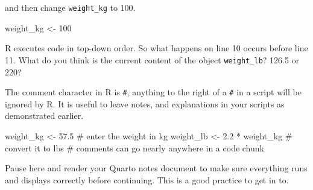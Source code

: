 \documentclass[
  letterpaper,
  DIV=11,
  numbers=noendperiod,
  oneside]{scrreprt}
\newenvironment{Shaded}{\begin{snugshade}}{\end{snugshade}}
\newcommand{\CommentTok}[1]{\textcolor[rgb]{0.37,0.37,0.37}{#1}}
\newcommand{\DecValTok}[1]{\textcolor[rgb]{0.68,0.00,0.00}{#1}}
\newcommand{\FloatTok}[1]{\textcolor[rgb]{0.68,0.00,0.00}{#1}}
\newcommand{\NormalTok}[1]{\textcolor[rgb]{0.00,0.23,0.31}{#1}}
\newcommand{\OtherTok}[1]{\textcolor[rgb]{0.00,0.23,0.31}{#1}}
\newcommand{\SpecialCharTok}[1]{\textcolor[rgb]{0.37,0.37,0.37}{#1}}
\begin{document}
and then change \texttt{weight\_kg} to 100.

\begin{Shaded}
\begin{Highlighting}[]
\NormalTok{weight\_kg }\OtherTok{\textless{}{-}} \DecValTok{100}
\end{Highlighting}
\end{Shaded}

R executes code in top-down order. So what happens on line 10 occurs
before line 11. What do you think is the current content of the object
\texttt{weight\_lb}? 126.5 or 220?

\begin{tcolorbox}[enhanced jigsaw, bottomrule=.15mm, colback=white, colframe=quarto-callout-note-color-frame, toprule=.15mm, coltitle=black, rightrule=.15mm, opacitybacktitle=0.6, colbacktitle=quarto-callout-note-color!10!white, toptitle=1mm, leftrule=.75mm, breakable, bottomtitle=1mm, titlerule=0mm, title=\textcolor{quarto-callout-note-color}{\faInfo}\hspace{0.5em}{Comment your code}, arc=.35mm, left=2mm, opacityback=0]

The comment character in R is \texttt{\#}, anything to the right of a
\texttt{\#} in a script will be ignored by R. It is useful to leave
notes, and explanations in your scripts as demonstrated earlier.

\begin{Shaded}
\begin{Highlighting}[]
\NormalTok{weight\_kg }\OtherTok{\textless{}{-}} \FloatTok{57.5} \CommentTok{\# enter the weight in kg}
\NormalTok{weight\_lb }\OtherTok{\textless{}{-}} \FloatTok{2.2} \SpecialCharTok{*}\NormalTok{ weight\_kg }\CommentTok{\# convert it to lbs}
\CommentTok{\# comments can go nearly anywhere in a code chunk}
\end{Highlighting}
\end{Shaded}

\end{tcolorbox}

\begin{tcolorbox}[enhanced jigsaw, bottomrule=.15mm, colback=white, colframe=quarto-callout-important-color-frame, toprule=.15mm, coltitle=black, rightrule=.15mm, opacitybacktitle=0.6, colbacktitle=quarto-callout-important-color!10!white, toptitle=1mm, leftrule=.75mm, breakable, bottomtitle=1mm, titlerule=0mm, title=\textcolor{quarto-callout-important-color}{\faExclamation}\hspace{0.5em}{Reminder: Render your document}, arc=.35mm, left=2mm, opacityback=0]

Pause here and render your Quarto notes document to make sure everything
runs and displays correctly before continuing. This is a good practice
to get in to.

\end{tcolorbox}
\end{document}

